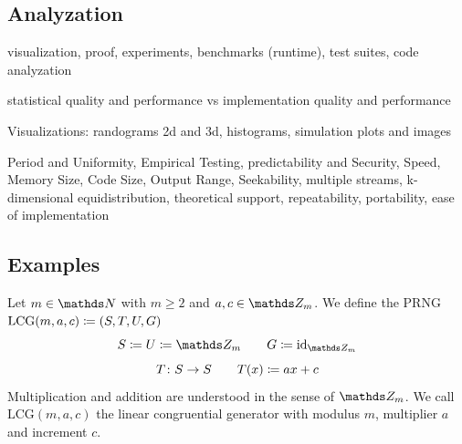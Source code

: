 \documentclass{stdlocal}
\begin{document}
  \subsection{Analyzation}
  visualization, proof, experiments, benchmarks (runtime), test suites, code analyzation

  statistical quality and performance vs implementation quality and performance

  Visualizations: randograms 2d and 3d, histograms, simulation plots and images

  Period and Uniformity, Empirical Testing, predictability and Security, Speed, Memory Size, Code Size, Output Range, Seekability, multiple streams, k-dimensional equidistribution, theoretical support, repeatability, portability, ease of implementation

  \subsection{Examples}
    \begin{definition}
      Let $m\in\setNatural$ with $m\geq 2$ and $a,c\in\setInteger_m$.
      We define the PRNG $\mathrm{LCG}(m,a,c) \coloneqq (S,T,U,G)$
      \[
        S \define U \define \setInteger_m
        \separate
        G \define \identity_{\setInteger_m}
      \]
      \[
        T\colon S\to S
        \qquad
        T(x) \coloneqq a x + c
      \]
      Multiplication and addition are understood in the sense of $\setInteger_m$.
      We call $\mathrm{LCG}(m,a,c)$ the linear congruential generator with modulus $m$, multiplier $a$ and increment $c$.
    \end{definition}

    \begin{definition}

    \end{definition}
\end{document}
